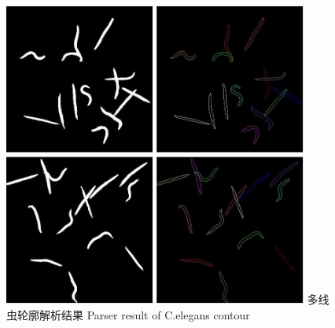 	\begin{figure}[!htb]
	  \centering
	  \includegraphics[width=10cm]{figure/chap4/Parser_Worms5.jpg}
	  \bicaption
		{多线虫轮廓解析结果}
		{Parser result of C.elegans contour}
	  \label{fig:chap4:parser}
	\end{figure}

